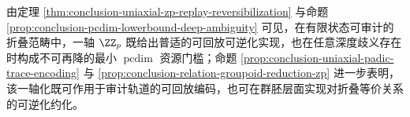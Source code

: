 \par
由定理 \ref{thm:conclusion-uniaxial-zp-replay-reversibilization} 与命题 \ref{prop:conclusion-pcdim-lowerbound-deep-ambiguity} 可见，在有限状态可审计的折叠范畴中，一轴 \(\ZZ_p\) 既给出普适的可回放可逆化实现，也在任意深度歧义存在时构成不可再降的最小 \(\operatorname{pcdim}\) 资源门槛；命题 \ref{prop:conclusion-uniaxial-padic-trace-encoding} 与 \ref{prop:conclusion-relation-groupoid-reduction-zp} 进一步表明，该一轴化既可作用于审计轨道的可回放编码，也可在群胚层面实现对折叠等价关系的可逆化约化。
